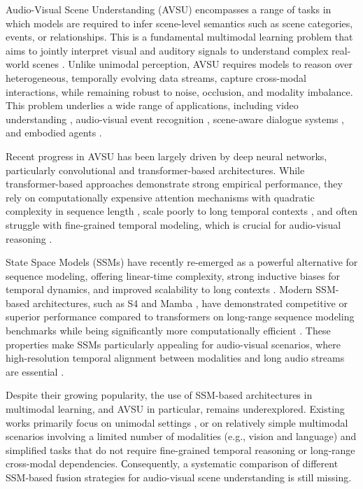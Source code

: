 \documentclass[a4paper,12pt]{extarticle}
\begin{document}
Audio-Visual Scene Understanding (AVSU) encompasses a range of tasks in which models are required to infer scene-level semantics such as scene categories, events, or relationships. This is a fundamental multimodal learning problem that aims to jointly interpret visual and auditory signals to understand complex real-world scenes \cite{baltrusaitis2019multimodal, tsai2019multimodal}. Unlike unimodal perception, AVSU requires models to reason over heterogeneous, temporally evolving data streams, capture cross-modal interactions, while remaining robust to noise, occlusion, and modality imbalance. This problem underlies a wide range of applications, including video understanding \cite{sarkar2024jointAV}, audio-visual event recognition \cite{brousmiche2021mafnet}, scene-aware dialogue systems \cite{alamri2019audio}, and embodied agents \cite{gao2023sonicverse}.

Recent progress in AVSU has been largely driven by deep neural networks, particularly convolutional \cite{gong2022uavm, nagrani2021attention} and transformer-based \cite{avsegformer2023, maavt2024, avesformer2025} architectures. While transformer-based approaches demonstrate strong empirical performance, they rely on computationally expensive attention mechanisms with quadratic complexity in sequence length \cite{vaswani2017attention}, scale poorly to long temporal contexts \cite{tay2020efficient}, and often struggle with fine-grained temporal modeling, which is crucial for audio-visual reasoning \cite{wu2019pay}.

State Space Models (SSMs) \cite{somvanshi2025survey} have recently re-emerged as a powerful alternative for sequence modeling, offering linear-time complexity, strong inductive biases for temporal dynamics, and improved scalability to long contexts \cite{gu2021s4, smith2022s5, dao2024mamba}. Modern SSM-based architectures, such as S4 \cite{gu2021s4} and Mamba \cite{dao2024mamba}, have demonstrated competitive or superior performance compared to transformers on long-range sequence modeling benchmarks while being significantly more computationally efficient \cite{gu2021s4, dao2024mamba}. These properties make SSMs particularly appealing for audio-visual scenarios, where high-resolution temporal alignment between modalities and long audio streams are essential \cite{cavmaesync2025, dailyomni2025, maavt2024}.

Despite their growing popularity, the use of SSM-based architectures in multimodal learning, and AVSU in particular, remains underexplored. Existing works primarily focus on unimodal settings \cite{goel2022sashimi, liang2024pointmamba}, or on relatively simple multimodal scenarios \cite{pantazopoulos2024shakingupvlms, maavt2024, zhu2024vlmamba} involving a limited number of modalities (e.g., vision and language) and simplified tasks that do not require fine-grained temporal reasoning or long-range cross-modal dependencies. Сonsequently, a systematic comparison of different SSM-based fusion strategies for audio-visual scene understanding is still missing.
\end{document}
